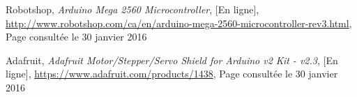  Robotshop, \textit{Arduino Mega 2560 Microcontroller}, [En ligne], \url{http://www.robotshop.com/ca/en/arduino-mega-2560-microcontroller-rev3.html}, Page consultée le 30 janvier 2016

 Adafruit, \textit{Adafruit Motor/Stepper/Servo Shield for Arduino v2 Kit - v2.3}, [En ligne], \url{https://www.adafruit.com/products/1438}, Page consultée le 30 janvier 2016